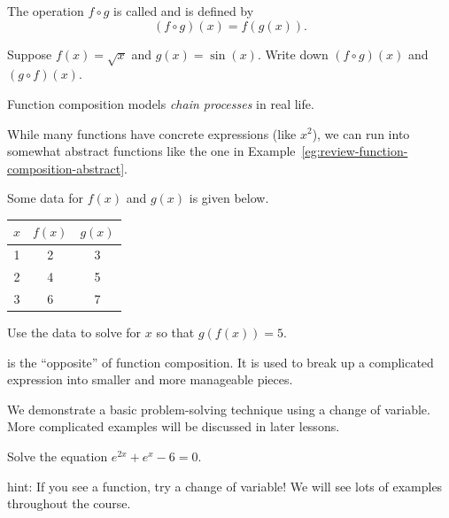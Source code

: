 \documentclass[../main.tex]{subfiles}
\begin{document}
\clearpage
\faStar{} The operation \(f \circ g\) is called  and is defined by
\[
  (f \circ g)(x) = f(g(x)).
\]
\begin{example}
  Suppose \(f(x) = \sqrt{x}\) and \(g(x) = \sin(x)\). Write down \((f \circ g)(x)\) and \((g \circ f)(x)\).

\end{example}

Function composition models \emph{chain processes} in real life.


While many functions have concrete expressions (like \(x^{2}\)), we can run into somewhat abstract functions like the one in Example~\ref{eg:review-function-composition-abstract}.

\begin{example} \label{eg:review-function-composition-abstract}
  Some data for \(f(x)\) and \(g(x)\) is given below.
  \begin{center}
    \begin{tabular}{c|c|c}
      \(x\) & \(f(x)\) & \(g(x)\) \\\midrule
      1 & 2 & 3 \\
      2 & 4 & 5 \\
      3 & 6 & 7
    \end{tabular}
  \end{center}

  Use the data to solve for \(x\) so that \(g(f(x)) = 5\).

  \blanks*
\end{example}
\clearpage

 is the \enquote{opposite} of function composition. It is used to break up a complicated expression into smaller and more manageable pieces.

We demonstrate a basic problem-solving technique using a change of variable. More complicated examples will be discussed in later lessons.
\begin{example}
  Solve the equation \(e^{2x} + e^{x} - 6 = 0\).

  \blanks*
\end{example}

\faStar{}  hint: If you see a  function, try a change of variable! We will see lots of examples throughout the course.
\end{document}
